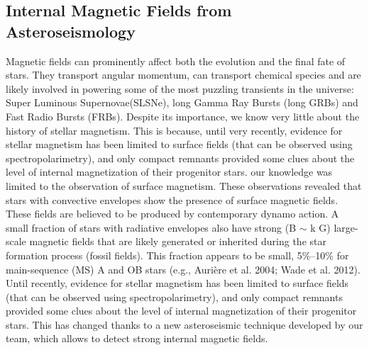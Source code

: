 {\color{red}\subsection{Internal Magnetic Fields from Asteroseismology}}
Magnetic fields can prominently affect both the evolution and the final fate of stars. They transport angular momentum, can transport chemical species
and are likely involved in powering some of the most puzzling transients in the universe: Super Luminous Supernovae(SLSNe), long Gamma Ray Bursts (long GRBs) and Fast Radio Bursts (FRBs). 
Despite its importance, we know very little about the history of stellar magnetism. This is  because, until very recently, 
evidence for stellar magnetism has been limited to surface fields (that can be observed using spectropolarimetry),
and only compact remnants provided some clues about the level of internal magnetization of their progenitor stars.
our knowledge was limited to the observation of surface magnetism.
These observations revealed that stars with convective envelopes show the presence of
surface magnetic fields. These fields are believed to be produced by contemporary dynamo action.
A small fraction of stars with radiative envelopes also have strong (B $\sim$ k G)
large-scale magnetic fields that are likely generated or inherited during the star
formation process (fossil fields). 
This fraction appears to be small, 5\%–10\% for main-sequence (MS) A and OB stars (e.g., Aurière et al. 2004; Wade et al. 2012). 
Until recently, evidence for stellar magnetism has been limited to surface fields (that can be observed using spectropolarimetry),
and only compact remnants provided some clues about the level of internal magnetization of their progenitor stars.
This has changed thanks to a new asteroseismic technique developed by our team, which allows to detect strong internal magnetic fields.